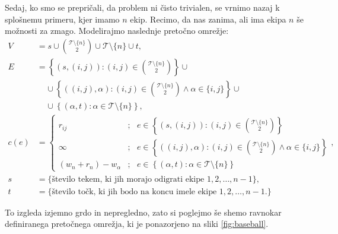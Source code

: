 \documentclass[mat1]{fmfdelo}
\begin{document}
Sedaj, ko smo se prepričali, da problem ni čisto trivialen, se vrnimo nazaj k splošnemu primeru, kjer imamo $n$ ekip. Recimo, da nas zanima, ali ima ekipa $n$ še možnosti za zmago. Modelirajmo naslednje pretočno omrežje:
\begin{align*}
V &= s \cup \binom{\mathcal{T} \setminus \{n\}}{2} \cup \mathcal{T} \setminus \{n\} \cup t,\\
E &= \left\{(s,(i,j)) : (i,j) \in \binom{\mathcal{T} \setminus \{n\}}{2}\right\} \cup\\
&~~~~~\cup \left\{((i,j), \alpha) : (i,j) \in \binom{\mathcal{T} \setminus \{n\}}{2} \wedge \alpha \in \{i,j\}\right\} \cup\\
&~~~~~\cup \left\{(\alpha, t) : \alpha \in \mathcal{T} \setminus \{n\}\right\},\\
c(e) &=\begin{cases}
r_{ij} &;~~~ e \in \left\{(s,(i,j)) : (i,j) \in \binom{\mathcal{T} \setminus \{n\}}{2}\right\}\\
\infty &;~~~ e \in \left\{((i,j), \alpha) : (i,j) \in \binom{\mathcal{T} \setminus \{n\}}{2} \wedge \alpha \in \{i,j\}\right\}\\
(w_n + r_n) - w_{\alpha} &;~~~ e \in \left\{(\alpha, t) : \alpha \in \mathcal{T} \setminus \{n\}\right\}
\end{cases},\\
s &= \{\textrm{število tekem, ki jih morajo odigrati ekipe $1,2,\dotsc,n-1$}\},\\
t &= \{\textrm{število točk, ki jih bodo na koncu imele ekipe $1,2,\dotsc, n-1$}.\}
\end{align*}

To izgleda izjemno grdo in nepregledno, zato si poglejmo še shemo ravnokar definiranega pretočnega omrežja, ki je ponazorjeno na sliki \ref{fig:baseball}.
\end{document}
